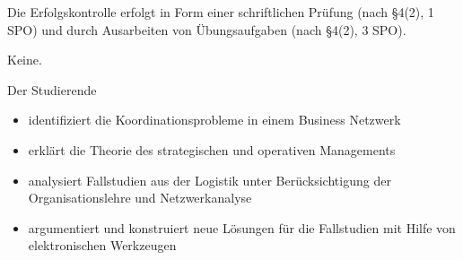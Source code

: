 \begin{course}

\setdoclanguagegerman
{}



\coursehead


\label{cour_4811.dp_997}


\begin{styleenv}
\begin{assessment}
Die Erfolgskontrolle erfolgt in Form einer schriftlichen Prüfung (nach §4(2), 1 SPO) und durch Ausarbeiten von Übungsaufgaben (nach §4(2), 3 SPO).

 
\end{assessment}

\begin{conditions}Keine.\end{conditions}


\end{styleenv}

\begin{learningoutcomes}
Der Studierende

 \begin{itemize}\item identifiziert die Koordinationsprobleme in einem Business Netzwerk  \item erklärt die Theorie des strategischen und operativen Managements  \item analysiert Fallstudien aus der Logistik unter Berücksichtigung der Organisationslehre und Netzwerkanalyse  \item argumentiert und konstruiert neue Lösungen für die Fallstudien mit Hilfe von elektronischen Werkzeugen  \end{itemize}
\end{learningoutcomes}


\end{course}
